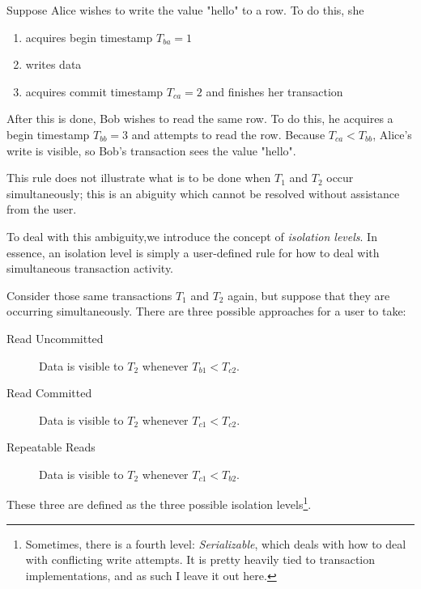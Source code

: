 \begin{exmp}
				Suppose Alice wishes to write the value "hello" to a row. To do this, she
				\begin{enumerate}
					\item acquires begin timestamp $T_{ba} = 1$
					\item writes data
					\item acquires commit timestamp $T_{ca} = 2$ and finishes her transaction
				\end{enumerate}
				After this is done, Bob wishes to read the same row. To do this, he acquires a begin timestamp $T_{bb} = 3$ and attempts to read the row. Because $T_{ca} < T_{bb}$, Alice's write is visible, so Bob's transaction sees the value "hello".
\end{exmp}

This rule does not illustrate what is to be done when $T_1$ and $T_2$ occur simultaneously; this is an abiguity which cannot be resolved without assistance from the user.

To deal with this ambiguity,we introduce the concept of \emph{isolation levels}. In essence, an isolation level is simply a user-defined rule for how to deal with simultaneous transaction activity.

Consider those same transactions $T_1$ and $T_2$ again, but suppose that they are occurring simultaneously. There are three possible approaches for a user to take:

\begin{description}
				\item[Read Uncommitted] Data is visible to $T_2$ whenever $T_{b1} < T_{c2}$.
				\item[Read Committed] Data is visible to $T_2$ whenever $T_{c1} < T_{c2}$.
				\item[Repeatable Reads] Data is visible to $T_2$ whenever $T_{c1} < T_{b2}$.
\end{description}

These three are defined as the three possible isolation levels\footnote{Sometimes, there is a fourth level: \emph{Serializable}, which deals with how to deal with conflicting write attempts. It is pretty heavily tied to transaction implementations, and as such I leave it out here. }.

